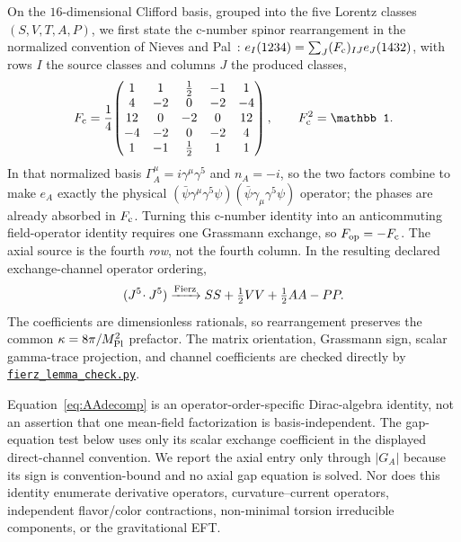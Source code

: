 \documentclass[aps,prd,twocolumn,superscriptaddress,showpacs,preprintnumbers,nofootinbib,longbibliography,floatfix]{revtex4-2}
\newcommand{\artifactnamed}[2]{\href{https://github.com/Hubify-Projects/bigbounce/blob/main/#1}{\nolinkurl{#2}}}
\begin{document}
On the $16$-dimensional Clifford basis, grouped into the five Lorentz classes
$(S,V,T,A,P)$, we first state the c-number spinor rearrangement in the
normalized convention of Nieves and Pal~\cite{ItzyksonZuber,NievesPal2004}:
$e_I(1234)=\sum_J(F_{\rm c})_{IJ}e_J(1432)$, with rows $I$ the source classes
and columns $J$ the produced classes,
\begin{equation}\label{eq:fierzmatrix}
F_{\rm c}=\frac14\!\begin{pmatrix}
1&1&\tfrac12&-1&1\\
4&-2&0&-2&-4\\
12&0&-2&0&12\\
-4&-2&0&-2&4\\
1&-1&\tfrac12&1&1
\end{pmatrix},\qquad F_{\rm c}^{2}=\mathbb 1.
\end{equation}
In that normalized basis $\Gamma_A^\mu=i\gamma^\mu\gamma^5$ and
$n_A=-i$, so the two factors combine to make $e_A$ exactly the physical
$(\bar\psi\gamma^\mu\gamma^5\psi)
(\bar\psi\gamma_\mu\gamma^5\psi)$ operator; the phases are already absorbed
in $F_{\rm c}$.  Turning this c-number identity into an anticommuting
field-operator identity requires one Grassmann exchange, so
$F_{\rm op}=-F_{\rm c}$.
The axial source is the fourth
\emph{row}, not the fourth column.  In the resulting declared exchange-channel
operator ordering,
\begin{equation}\label{eq:AAdecomp}
(J^5\!\cdot J^5)\xrightarrow{\rm Fierz}
SS+\tfrac12 VV+\tfrac12 AA-PP.
\end{equation}
The coefficients are dimensionless rationals, so rearrangement preserves the
common $\kappa=8\pi/M_{\rm Pl}^{2}$ prefactor.  The matrix orientation,
Grassmann sign, scalar gamma-trace projection, and channel coefficients are
checked directly by
\artifactnamed{arxiv/scripts/fierz_lemma_check.py}{fierz_lemma_check.py}.

Equation~\eqref{eq:AAdecomp} is an operator-order-specific Dirac-algebra
identity, not an assertion that one mean-field factorization is
basis-independent.  The gap-equation test below uses only its scalar exchange
coefficient in the displayed direct-channel convention.  We report the axial
entry only through $|G_A|$ because its sign is convention-bound and no axial
gap equation is solved.  Nor does this identity enumerate derivative
operators, curvature--current operators, independent flavor/color
contractions, non-minimal torsion irreducible components, or the gravitational
EFT.
\end{document}
